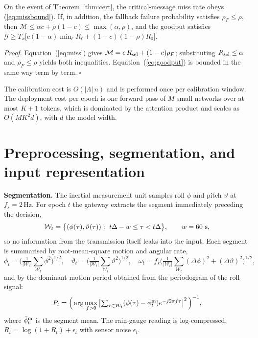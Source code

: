 \begin{proposition}\label{prop:service}
On the event of Theorem~\ref{thm:cert}, the critical-message miss rate obeys (\ref{eq:missbound}). If, in addition, the fallback failure probability satisfies $\rho_F\le\rho$, then $\mathcal M\le\alpha c+\rho(1-c)\le\max(\alpha,\rho)$, and the goodput satisfies $\mathcal G\ge T_x\big[c(1-\alpha)\min_\ell R_\ell+(1-c)(1-\rho)R_0\big]$.
\end{proposition}
\noindent\textit{Proof.} Equation~(\ref{eq:miss}) gives $\mathcal M=c\,R_{\rm sel}+(1-c)\rho_F$; substituting $R_{\rm sel}\le\alpha$ and $\rho_F\le\rho$ yields both inequalities. Equation~(\ref{eq:goodput}) is bounded in the same way term by term. $\square$

The calibration cost is $O(|\Lambda|\,n)$ and is performed once per calibration window. The deployment cost per epoch is one forward pass of $M$ small networks over at most $K+1$ tokens, which is dominated by the attention product and scales as $O(M K^2 d)$, with $d$ the model width.

\section{Preprocessing, segmentation, and input representation}\label{sec:prep}
\textbf{Segmentation.} The inertial measurement unit samples roll $\phi$ and pitch $\vartheta$ at $f_s=2$\,Hz. For epoch $t$ the gateway extracts the segment immediately preceding the decision,
\begin{equation}\label{eq:segment}
\mathcal W_t=\big\{(\phi(\tau),\vartheta(\tau)):\ t\Delta-w\le\tau<t\Delta\big\},\qquad w=60\ {\rm s},
\end{equation}
so no information from the transmission itself leaks into the input. Each segment is summarised by root-mean-square motion and angular rate,
\begin{equation}\label{eq:rms}
\bar\phi_t=\Big(\tfrac1{|\mathcal W_t|}\textstyle\sum_{\mathcal W_t}\phi^2\Big)^{1/2},\quad
\bar\vartheta_t=\Big(\tfrac1{|\mathcal W_t|}\textstyle\sum_{\mathcal W_t}\vartheta^2\Big)^{1/2},\quad
\omega_t=f_s\Big(\tfrac1{|\mathcal W_t|}\textstyle\sum_{\mathcal W_t}(\Delta\phi)^2+(\Delta\vartheta)^2\Big)^{1/2},
\end{equation}
and by the dominant motion period obtained from the periodogram of the roll signal:
\begin{equation}\label{eq:period}
P_t=\Big(\arg\max_{f>0}\left|\textstyle\sum_{\tau\in\mathcal W_t}(\phi(\tau)-\bar\phi^{\rm m}_t)e^{-j2\pi f\tau}\right|^2\Big)^{-1},
\end{equation}
where $\bar\phi^{\rm m}_t$ is the segment mean. The rain-gauge reading is log-compressed, $\tilde R_t=\log(1+R_t)+\epsilon_t$ with sensor noise $\epsilon_t$.

